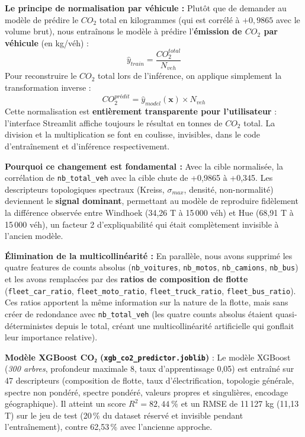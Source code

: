 \documentclass[10pt, a4paper]{article}
\begin{document}
\textbf{Le principe de normalisation par véhicule :} Plutôt que de
demander au modèle de prédire le \(CO_2\) total en kilogrammes (qui est
corrélé à \(+0,9865\) avec le volume brut), nous entraînons le modèle à
prédire l'\textbf{émission de \(CO_2\) par véhicule} (en kg/véh) :
\[\hat{y}_{train} = \frac{CO_2^{total}}{N_{veh}}\] Pour reconstruire le
\(CO_2\) total lors de l'inférence, on applique simplement la
transformation inverse :
\[CO_2^{prédit} = \hat{y}_{model}(\mathbf{x}) \times N_{veh}\] Cette
normalisation est \textbf{entièrement transparente pour l'utilisateur} :
l'interface Streamlit affiche toujours le résultat en tonnes de \(CO_2\)
total. La division et la multiplication se font en coulisse, invisibles,
dans le code d'entraînement et d'inférence respectivement.

\textbf{Pourquoi ce changement est fondamental :} Avec la cible
normalisée, la corrélation de \texttt{nb\_total\_veh} avec la cible
chute de +0,9865 à +0,345. Les descripteurs topologiques spectraux
(Kreiss, \(\sigma_{max}\), densité, non-normalité) deviennent le
\textbf{signal dominant}, permettant au modèle de reproduire fidèlement
la différence observée entre Windhoek (34,26 T à 15\,000 véh) et Hue
(68,91 T à 15\,000 véh), un facteur 2 d'expliquabilité qui était
complètement invisible à l'ancien modèle.

\textbf{Élimination de la multicollinéarité :} En parallèle, nous avons
supprimé les quatre features de counts absolus (\texttt{nb\_voitures},
\texttt{nb\_motos}, \texttt{nb\_camions}, \texttt{nb\_bus}) et les avons
remplacées par des \textbf{ratios de composition de flotte}
(\texttt{fleet\_car\_ratio}, \texttt{fleet\_moto\_ratio},
\texttt{fleet\_truck\_ratio}, \texttt{fleet\_bus\_ratio}). Ces ratios
apportent la même information sur la nature de la flotte, mais sans
créer de redondance avec \texttt{nb\_total\_veh} (les quatre counts
absolus étaient quasi-déterministes depuis le total, créant une
multicollinéarité artificielle qui gonflait leur importance relative).

\textbf{Modèle XGBoost CO₂ (\texttt{xgb\_co2\_predictor.joblib})} : Le
modèle XGBoost (\emph{300 arbres}, profondeur maximale 8, taux
d'apprentissage 0,05) est entraîné sur 47 descripteurs (composition de
flotte, taux d'électrification, topologie générale, spectre non pondéré,
spectre pondéré, valeurs propres et singulières, encodage géographique).
Il atteint un score \(R^2 = 82{,}44\ \%\) et un RMSE de 11\,127 kg
(11,13 T) sur le jeu de test (20\,\% du dataset réservé et invisible
pendant l'entraînement), contre 62,53\,\% avec l'ancienne approche.
\end{document}
